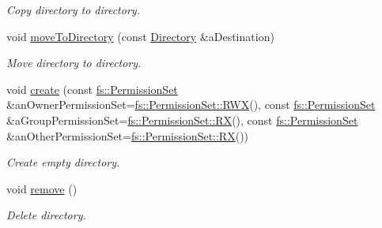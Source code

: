 \begin{DoxyCompactItemize}
\begin{DoxyCompactList}\small\item\em Copy directory to directory. \end{DoxyCompactList}\item 
void \hyperlink{classostk_1_1core_1_1fs_1_1_directory_a068eb2c941fb6f9852cb4d22bf4dcec1}{move\+To\+Directory} (const \hyperlink{classostk_1_1core_1_1fs_1_1_directory}{Directory} \&a\+Destination)
\begin{DoxyCompactList}\small\item\em Move directory to directory. \end{DoxyCompactList}\item 
void \hyperlink{classostk_1_1core_1_1fs_1_1_directory_ac102b4de554d4d3edb999ccff73d2109}{create} (const \hyperlink{classostk_1_1core_1_1fs_1_1_permission_set}{fs\+::\+Permission\+Set} \&an\+Owner\+Permission\+Set=\hyperlink{classostk_1_1core_1_1fs_1_1_permission_set_a9298592527e35edb785430f03e83e79f}{fs\+::\+Permission\+Set\+::\+R\+WX}(), const \hyperlink{classostk_1_1core_1_1fs_1_1_permission_set}{fs\+::\+Permission\+Set} \&a\+Group\+Permission\+Set=\hyperlink{classostk_1_1core_1_1fs_1_1_permission_set_a42a72499579b9639c112613effb2c128}{fs\+::\+Permission\+Set\+::\+RX}(), const \hyperlink{classostk_1_1core_1_1fs_1_1_permission_set}{fs\+::\+Permission\+Set} \&an\+Other\+Permission\+Set=\hyperlink{classostk_1_1core_1_1fs_1_1_permission_set_a42a72499579b9639c112613effb2c128}{fs\+::\+Permission\+Set\+::\+RX}())
\begin{DoxyCompactList}\small\item\em Create empty directory. \end{DoxyCompactList}\item 
void \hyperlink{classostk_1_1core_1_1fs_1_1_directory_a268a93961419f0418613b2d1baa5e71c}{remove} ()
\begin{DoxyCompactList}\small\item\em Delete directory. \end{DoxyCompactList}\end{DoxyCompactItemize}
